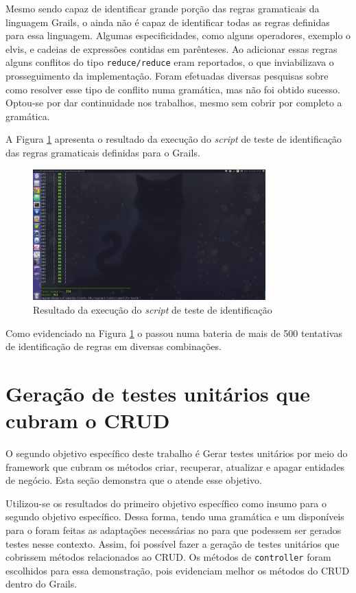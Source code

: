 Mesmo sendo capaz de identificar grande porção das regras gramaticais da
linguagem \textsf{Grails}, o \parser ainda não é capaz de identificar todas
as regras definidas para essa linguagem. Algumas especificidades, como alguns
operadores, exemplo o \textsf{elvis}, e cadeias de expressões contidas
em parênteses. Ao adicionar essas regras alguns conflitos do tipo
\lstinline|reduce/reduce| eram reportados, o que inviabilizava o
prosseguimento da implementação. Foram efetuadas diversas pesquisas
sobre como resolver esse tipo de conflito numa gramática, mas não foi
obtido sucesso. Optou-se por dar continuidade nos trabalhos, mesmo sem
cobrir por completo a gramática.

A Figura \ref{identification-test} apresenta o resultado da execução do
\textit{script} de teste de identificação das regras gramaticais definidas
para o \textsf{Grails}.
\begin{figure}[h]
  \centering
    \includegraphics[width=0.8\textwidth]{figuras/identification-test.png}
    \caption{Resultado da execução do \textit{script} de teste de identificação}
    \label{identification-test}
\end{figure}
\FloatBarrier

Como evidenciado na Figura \ref{identification-test} o \parser passou numa
bateria de mais de 500 tentativas de identificação de regras em diversas
combinações.

\section{Geração de testes unitários que cubram o CRUD}
O segundo objetivo específico deste trabalho é \textsf{Gerar testes unitários por meio
do framework que cubram os métodos criar, recuperar, atualizar e apagar
entidades de negócio}. Esta seção demonstra que o \scarefault atende
esse objetivo.

Utilizou-se os resultados do primeiro objetivo específico como insumo
para o segundo objetivo específico. Dessa forma, tendo uma gramática e
um \parser disponíveis para o \grails foram feitas as adaptações necessárias
no \framework para que podessem ser gerados testes nesse contexto.
Assim, foi possível fazer a geração de testes unitários que cobrissem
métodos relacionados ao CRUD. Os métodos de \lstinline|controller| foram
escolhidos para essa demonstração, pois evidenciam melhor os métodos
do CRUD dentro do \textsf{Grails}.

